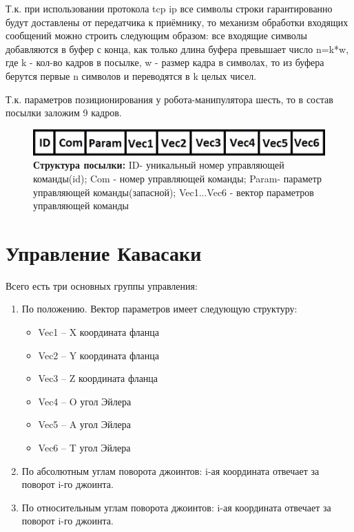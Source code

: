 \documentclass[a4paper,14pt,russian]{extreport} \usepackage{extsizes}
\begin{document}
	  Т.к. при использовании протокола tcp ip все символы строки гарантированно будут доставлены от передатчика к приёмнику, то механизм обработки входящих сообщений можно строить следующим образом: все входящие символы добавляются в буфер с конца, как только длина буфера превышает число n=k*w, где k - кол-во кадров в посылке, w - размер кадра в символах, то из буфера берутся первые n символов и переводятся в k целых чисел.
	  
	 Т.к. параметров позиционирования у робота-манипулятора шесть, то в состав посылки заложим 9 кадров.
	 
	 	\begin{figure}[ht]
	 		\centering		 
	 		\includegraphics{./img/img41.jpg}	
	 		\caption{
	 			\textbf{ Структура посылки:} 				
	 				ID- уникальный  номер управляющей команды(id);	 				
	 				Com - номер управляющей команды;	 				
	 				Param- параметр управляющей команды(запасной);	 				
	 				Vec1...Vec6 - вектор параметров управляющей команды}     
	 		\label{fig_img51}
	 	\end{figure}
	 		
	 \section{Управление Кавасаки}
	 Всего есть три основных группы управления:
	 \begin{enumerate}  

		 \item{По положению. Вектор параметров имеет следующую структуру: 
	\begin{itemize}
	 \item{Vec1 – X координата фланца}
	 \item{Vec2 – Y координата фланца}
	 \item{ Vec3 – Z координата фланца}
	 \item{Vec4 – O угол Эйлера}
	 \item{Vec5 – A угол Эйлера} 
  	\item{ Vec6 – T угол Эйлера}
	\end{itemize}
	 }
	 \item{По абсолютным углам поворота джоинтов: i-ая координата отвечает за поворот  i-го джоинта.}
	 \item{По относительным углам поворота джоинтов:  i-ая координата отвечает  за поворот  i-го джоинта.}
	\end{enumerate}
	 
\end{document}
